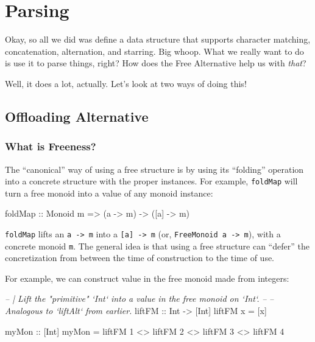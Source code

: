 \documentclass[]{article}
\newenvironment{Shaded}{}{}
\newcommand{\CommentTok}[1]{\textcolor[rgb]{0.38,0.63,0.69}{\textit{#1}}}
\newcommand{\DataTypeTok}[1]{\textcolor[rgb]{0.56,0.13,0.00}{#1}}
\newcommand{\DecValTok}[1]{\textcolor[rgb]{0.25,0.63,0.44}{#1}}
\newcommand{\FunctionTok}[1]{\textcolor[rgb]{0.02,0.16,0.49}{#1}}
\newcommand{\NormalTok}[1]{#1}
\newcommand{\OtherTok}[1]{\textcolor[rgb]{0.00,0.44,0.13}{#1}}
\begin{document}
\hypertarget{parsing}{%
\section{Parsing}\label{parsing}}

Okay, so all we did was define a data structure that supports character
matching, concatenation, alternation, and starring. Big whoop. What we really
want to do is use it to parse things, right? How does the Free Alternative help
us with \emph{that}?

Well, it does a lot, actually. Let's look at two ways of doing this!

\hypertarget{offloading-alternative}{%
\subsection{Offloading Alternative}\label{offloading-alternative}}

\hypertarget{what-is-freeness}{%
\subsubsection{What is Freeness?}\label{what-is-freeness}}

The ``canonical'' way of using a free structure is by using its ``folding''
operation into a concrete structure with the proper instances. For example,
\texttt{foldMap} will turn a free monoid into a value of any monoid instance:

\begin{Shaded}
\begin{Highlighting}[]
\FunctionTok{foldMap}\OtherTok{ ::} \DataTypeTok{Monoid}\NormalTok{ m }\OtherTok{=>}\NormalTok{ (a }\OtherTok{->}\NormalTok{ m) }\OtherTok{->}\NormalTok{ ([a] }\OtherTok{->}\NormalTok{ m)}
\end{Highlighting}
\end{Shaded}

\texttt{foldMap} lifts an \texttt{a\ -\textgreater{}\ m} into a
\texttt{{[}a{]}\ -\textgreater{}\ m} (or,
\texttt{FreeMonoid\ a\ -\textgreater{}\ m}), with a concrete monoid \texttt{m}.
The general idea is that using a free structure can ``defer'' the concretization
from between the time of construction to the time of use.

For example, we can construct value in the free monoid made from integers:

\begin{Shaded}
\begin{Highlighting}[]
\CommentTok{-- | Lift the "primitive" `Int` into a value in the free monoid on `Int`.}
\CommentTok{--}
\CommentTok{-- Analogous to `liftAlt` from earlier.}
\OtherTok{liftFM ::} \DataTypeTok{Int} \OtherTok{->}\NormalTok{ [}\DataTypeTok{Int}\NormalTok{]}
\NormalTok{liftFM x }\FunctionTok{=}\NormalTok{ [x]}

\OtherTok{myMon ::}\NormalTok{ [}\DataTypeTok{Int}\NormalTok{]}
\NormalTok{myMon }\FunctionTok{=}\NormalTok{ liftFM }\DecValTok{1} \FunctionTok{<>}\NormalTok{ liftFM }\DecValTok{2} \FunctionTok{<>}\NormalTok{ liftFM }\DecValTok{3} \FunctionTok{<>}\NormalTok{ liftFM }\DecValTok{4}
\end{Highlighting}
\end{Shaded}
\end{document}
